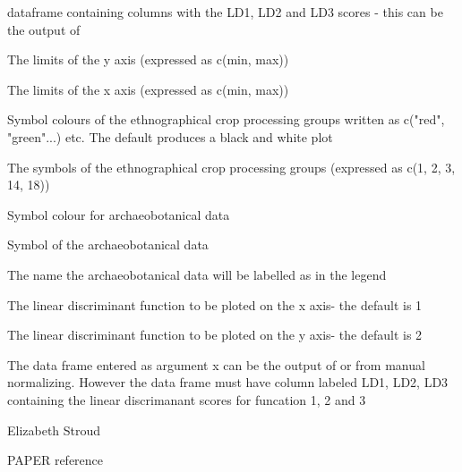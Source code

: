 \documentclass[a4paper]{book}
\begin{document}
\begin{Arguments}
\begin{ldescription}
\item[\code{x}] dataframe containing columns with the LD1, LD2 and LD3 scores - this can be the output of 
\item[\code{ylims}] The limits of the y axis (expressed as c(min, max))
\item[\code{xlims}] The limits of the x axis (expressed as c(min, max))
\item[\code{gcols}] Symbol colours of the ethnographical crop processing groups written as c("red", "green"...) etc. The default produces a black and white plot
\item[\code{gpchs}] The symbols of the ethnographical crop processing groups (expressed as c(1, 2, 3, 14, 18))
\item[\code{col}] Symbol colour for archaeobotanical data
\item[\code{pch}] Symbol of the archaeobotanical data
\item[\code{site}] The name the archaeobotanical data will be labelled as in the legend
\item[\code{Func1}] The linear discriminant function to be ploted on the x axis- the default is 1
\item[\code{Func2}] The linear discriminant function to be ploted on the y axis- the default is 2
\end{ldescription}
\end{Arguments}
%
\begin{Details}\relax
The data frame entered as argument x can be the output of  or from manual normalizing. However the data frame must have column labeled LD1, LD2, LD3 containing the linear discrimanant scores for funcation 1, 2 and 3
\end{Details}
%
\begin{Author}\relax
Elizabeth Stroud

\end{Author}
%
\begin{References}\relax
PAPER reference

\end{References}
%
\end{document}
